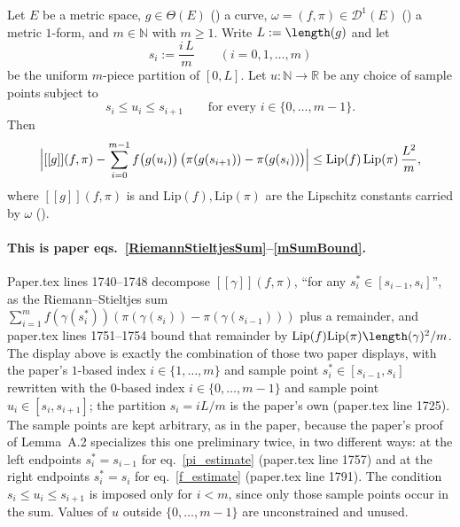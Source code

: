 \begin{lemma}
  Let $E$ be a metric space, $g \in \Theta(E)$ () a curve, $\omega = (f,\pi) \in
  \mathcal{D}^1(E)$ () a metric $1$-form, and $m \in \mathbb{N}$ with $m \ge 1$.
  Write $L := \length(g)$ and let
  \[
    s_i := \frac{i\,L}{m} \qquad (i = 0,1,\dots,m)
  \]
  be the uniform $m$-piece partition of $[0,L]$. Let $u : \mathbb{N} \to \mathbb{R}$ be any choice
  of sample points subject to
  \[
    s_i \le u_i \le s_{i+1} \qquad \text{for every } i \in \{0,\dots,m-1\}
    .
  \]
  Then
  \[
    \Bigl| [[g]](f,\pi) - \sum_{i=0}^{m-1} f\bigl(g(u_i)\bigr)\,
      \bigl(\pi(g(s_{i+1})) - \pi(g(s_i))\bigr) \Bigr|
      \le \mathrm{Lip}(f)\,\mathrm{Lip}(\pi)\,\frac{L^2}{m}
    ,
  \]
  where $[[g]](f,\pi)$ is  and $\mathrm{Lip}(f), \mathrm{Lip}(\pi)$ are the
  Lipschitz constants carried by $\omega$ ().

  \paragraph{This is paper eqs.~\eqref{RiemannStieltjesSum}--\eqref{mSumBound}.} Paper.tex
  lines 1740--1748 decompose $[[\gamma]](f,\pi)$, ``for any $s_i^* \in [s_{i-1},s_i]$'', as the
  Riemann--Stieltjes sum $\sum_{i=1}^m f(\gamma(s_i^*))(\pi(\gamma(s_i))-\pi(\gamma(s_{i-1})))$
  plus a remainder, and paper.tex lines 1751--1754 bound that remainder by
  $\mathrm{Lip}(f)\mathrm{Lip}(\pi)\length(\gamma)^2/m$. The display above is exactly the
  combination of those two paper displays, with the paper's $1$-based index $i \in \{1,\dots,m\}$
  and sample point $s_i^* \in [s_{i-1},s_i]$ rewritten with the $0$-based index $i \in
  \{0,\dots,m-1\}$ and sample point $u_i \in [s_i,s_{i+1}]$; the partition $s_i = iL/m$ is the
  paper's own (paper.tex line 1725). The sample points are kept arbitrary, as in the paper,
  because the paper's proof of Lemma~A.2 specializes this one preliminary twice, in two different
  ways: at the left endpoints $s_i^* = s_{i-1}$ for eq.~\eqref{pi_estimate} (paper.tex line 1757)
  and at the right endpoints $s_i^* = s_i$ for eq.~\eqref{f_estimate} (paper.tex line 1791). The
  condition $s_i \le u_i \le s_{i+1}$ is imposed only for $i < m$, since only those sample points
  occur in the sum. Values of $u$ outside $\{0,\dots,m-1\}$ are unconstrained and unused.
\end{lemma}
